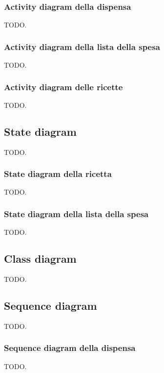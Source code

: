 \documentclass{article}
\begin{document}
\subsubsection{Activity diagram della dispensa}

TODO.

\subsubsection{Activity diagram della lista della spesa}

TODO.

\subsubsection{Activity diagram delle ricette}

TODO.

\subsection{State diagram}

TODO.

\subsubsection{State diagram della ricetta}

TODO.

\subsubsection{State diagram della lista della spesa}

TODO.

\subsection{Class diagram}

TODO.

\subsection{Sequence diagram}

TODO.

\subsubsection{Sequence diagram della dispensa}

TODO.
\end{document}
